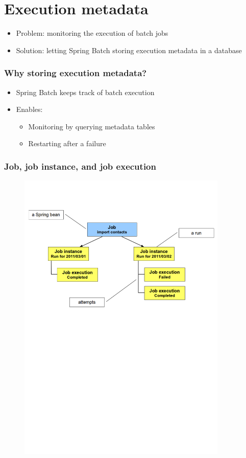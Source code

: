 \section{Execution metadata}

\begin{frame}
 \begin{itemize}
  \item Problem: monitoring the execution of batch jobs
  \item Solution: letting Spring Batch storing execution metadata in a database
 \end{itemize}
\end{frame}

\begin{frame}
 \frametitle{Why storing execution metadata?}
 \begin{itemize}
  \item Spring Batch keeps track of batch execution
  \item Enables:
  \begin{itemize}
    \item Monitoring by querying metadata tables
    \item Restarting after a failure
  \end{itemize}
 \end{itemize}
\end{frame}


\begin{frame}
 \frametitle{Job, job instance, and job execution}
 \begin{figure}
  \begin{center}
  \includegraphics[width=10cm]{figures/jobinstance.pdf}
  \end{center}
 \end{figure}
\end{frame}


